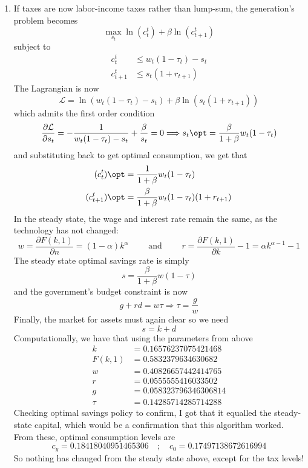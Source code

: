 \documentclass[10pt]{article}
\begin{document}
\begin{enumerate}
	\item If taxes are now labor-income taxes rather than lump-sum, the generation's problem becomes \[\max_{s_t} \ln(c_t^t) + \beta \ln(c_{t+1}^t) \]subject to\begin{align*} c_t^t &\le w_t(1-\tau_t) - s_t \\ c_{t+1}^t &\le s_t(1 + r_{t+1})\end{align*}The Lagrangian is now \[\mathcal{L} = \ln(w_t(1-\tau_t) - s_t) + \beta \ln (s_t(1 + r_{t+1}))\]which admits the first order condition\[\frac{\partial \mathcal{L}}{\partial s_t} = -\frac{1}{w_t(1-\tau_t) - s_t} + \frac{\beta }{s_t} = 0 \Longrightarrow s_t\opt = \frac{\beta}{1+\beta}w_t(1-\tau_t) \]and substituting back to get optimal consumption, we get that \begin{align*} (c_t^t)\opt &= \frac{1}{1+\beta}w_t(1-\tau_t) \\ (c^t_{t+1})\opt &= \frac{\beta}{1+\beta} w_t(1-\tau_t)(1+r_{t+1})\end{align*}In the steady state, the wage and interest rate remain the same, as the technology has not changed:\[w = \frac{\partial F(k,1)}{\partial n} = (1-\alpha)k^\alpha \qquad \text{ and } \qquad r = \frac{\partial F(k,1)}{\partial k} - 1 = \alpha k^{\alpha -1}-1\]The steady state optimal savings rate is simply\[s = \frac{\beta}{1+\beta}w(1-\tau)\]and the government's budget constraint is now \[g+rd = w\tau \Longrightarrow \tau = \frac{g}{w}\]Finally, the market for assets must again clear so we need \[s = k + d\]Computationally, we have that using the parameters from above\begin{align*} k &= 0.16576237075421468 \\ F(k,1) &= 0.5832379634630682 \\ w &= 0.40826657442414765 \\ r &= 0.0555555416033502 \\ g &= 0.058323796346306814 \\ \tau &= 0.14285714285714288 \end{align*}Checking optimal savings policy to confirm, I got that it equalled the steady-state capital, which would be a confirmation that this algorithm worked. From these, optimal consumption levels are \[c_y = 0.18418040951465306 \quad ; \quad c_0 = 0.17497138672616994\]So nothing has changed from the steady state above, except for the tax levels!

\end{enumerate}
\end{document}
